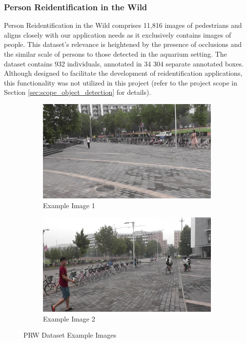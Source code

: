 \subsubsection{Person Reidentification in the Wild}
\label{sec:dataset_PRW}
Person Reidentification in the Wild comprises 11,816 images of pedestrians and aligns closely with our application needs as it exclusively contains images of people. This dataset's relevance is heightened by the presence of occlusions and the similar scale of persons to those detected in the aquarium setting. The dataset contains 932 individuals, annotated in 34 304 separate annotated boxes. Although designed to facilitate the development of reidentification applications, this functionality was not utilized in this project (refer to the project scope in Section \ref{sec:scope_object_detection} for details).

\begin{figure}[H]
    \centering
    \begin{subfigure}{0.49\textwidth}
        \centering
        \includegraphics[width=\textwidth]{Images/External_datasets/PRW_1.jpg}
        \caption{\centering Example Image 1}
    \end{subfigure}
    \hfill
    \begin{subfigure}{0.49\textwidth}
        \centering
        \includegraphics[width=\textwidth]{Images/External_datasets/PRW_2.jpg}
        \caption{\centering Example Image 2}
    \end{subfigure}
    \caption{\centering PRW Dataset Example Images}
    \label{fig:PRW_examples}
\end{figure}

